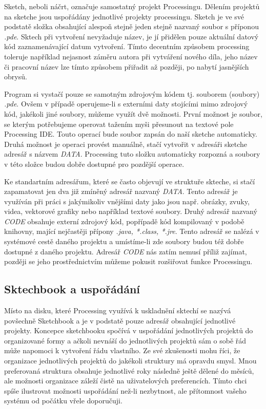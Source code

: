 \documentclass[11pt]{article}
\begin{document}
Sketch, neboli náčrt, označuje samostatný projekt Processingu. Dělením projektů na sketche jsou uspořádány jednotlivé projekty processingu. Sketch je ve své podstatě složka obsahující alespoň stejně jeden stejně nazvaný soubor s příponou {\em *.pde}. Sktech při vytvoření nevyžaduje název, je jí přidělen pouze aktuální datový kód zaznamenávající datum vytvoření. Tímto decentním způsobem processing toleruje například nejasnost záměru autora při vytváření nového díla, jeho název či pracovní název lze tímto způsobem přiřadit až později, po nabytí jasnějších obrysů.

Program si vystačí pouze se samotným zdrojovým kódem tj. souborem (soubory) {\em *.pde}. Ovšem v případě operujeme-li s externími daty stojícími mimo zdrojový kód, jakékoli jiné soubory, můžeme využít dvě možnosti. První možnost je soubor, se kterým potřebujeme operovat tažením myši přesunout na textové pole Processing IDE. Touto operací bude soubor zapsán do naší sketche automaticky. Druhá možnost je operaci provést manuálně, stačí vytvořit v adresáři sketche adresář s názvem {\em DATA}. Processing tuto složku automaticky rozpozná a soubory v této složce budou dobře dostupné pro pozdější operace.

Ke standartním adresářum, které se často objevují ve struktuře skteche, si stačí zapamatovat jen dva již zmíněný adresář nazvaný {\em DATA}. Tento adresář je využíván při práci s jakýmikoliv vnějšími daty jako jsou např. obrázky, zvuky, videa, vektorové grafiky nebo například textové soubory. Druhý adresář nazvaný {\em CODE} obsahuje externí zdrojový kód, popřípadě kód kompilovaný v podobě knihovny, mající nejčastěji přípony {\em *.java, *.class, *.jre}. Tento adresář se nalézá v systémové cestě daného projektu a umístíme-li zde soubory budou též dobře dostupné z daného projektu. Adresář {\em CODE} nás zatím nemusí příliž zajímat, později se jeho prostřednictvím můžeme pokusit rozšiřovat funkce Processingu.

\subsection{Sktechbook a uspořádání}

Místo na disku, které Processing využívá k uskladnění sktechí se nazývá povšechně Sketchbook a je v podstatě pouze adresář obsahující jednotlivé projekty. Koncepce sketchbooku spočívá v uspořádání jednotlivých projektů do organizované formy a ačkoli nevnáší do jednotlivých projektů sám o sobě řád může napomoci k vytvoření řádu vlastního. Ze své zkušenosti mohu říci, že organizace jednotlivých projektů do jakékoli struktury má opravdu smysl. Mnou preferovaná struktura obsahuje jednotlivé roky následně ještě dělené do měsíců, ale možnosti organizace záleží čistě na uživatelových preferencích. Tímto chci spíše ilustrovat možnosti uspořádání než-li nezbytnost, ale přítomnost vašeho systému od počátku vřele doporučuji.
\end{document}
